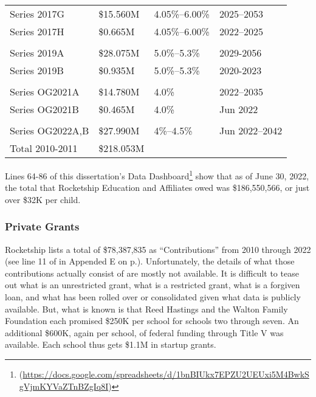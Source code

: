 \begin{table}[ht]
\begin{tabular}{llll}
                                                                   \\
    Series 2017G     & \$15.560M & 4.05\%–6.00\%  & 2025–2053      \\
    Series 2017H     & \$0.665M  &  4.05\%–6.00\% & 2022–2025      \\
                                                                   \\
    Series 2019A     & \$28.075M & 5.0\%–5.3\%    & 2029-2056      \\
    Series 2019B     & \$0.935M  & 5.0\%–5.3\%    & 2020-2023      \\
                                                                   \\
    Series OG2021A   & \$14.780M & 4.0\%          & 2022–2035      \\
    Series OG2021B   & \$0.465M  & 4.0\%          & Jun 2022       \\
                                                                   \\
    Series OG2022A,B & \$27.990M & 4\%–4.5\%      & Jun 2022–2042  \\
    \midrule
    Total 2010-2011  & \$218.053M                                  \\
    \bottomrule
  \end{tabular}
\end{table}

Lines 64-86 of this dissertation's Data Dashboard\footnote{ (\url{https://docs.google.com/spreadsheets/d/1bnBIUkx7EPZU2UEUxi5M4BwkSgVjmKYVaZTnBZgIq8I})} show that as of June 30, 2022, the total that Rocketship Education and Affiliates owed was \$186,550,566, or just over \$32K per child.

\subsubsection{Private Grants}%
\label{sec:private-grants}\indent%

Rocketship lists a total of \$78,387,835 as ``Contributions'' from 2010 through 2022 (see line 11 of  in Appended E on p.\pageref{tab:consolidated_activities}). Unfortunately, the details of what those contributions actually consist of are mostly not available. It is difficult to tease out what is an unrestricted grant, what is a restricted grant, what is a forgiven loan, and what has been rolled over or consolidated given what data is publicly available. But, what is known is that Reed Hastings and the Walton Family Foundation each promised \$250K per school for schools two through seven. An additional \$600K, again per school, of federal funding through Title V was available. Each school thus gets \$1.1M in startup grants.

